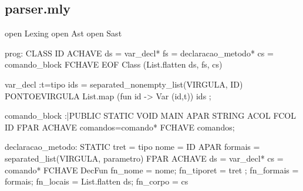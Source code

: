\documentclass[12pt,a4paper,twoside]{report}
\begin{document}
\subsection{parser.mly}
\begin{terminal}

open Lexing
open Ast
open Sast







prog: 
	   CLASS ID ACHAVE
            ds = var_decl*
            fs = declaracao_metodo*
            cs = comando_block
          FCHAVE
          EOF { Class (List.flatten ds, fs, cs) }


var_decl :t=tipo ids = separated_nonempty_list(VIRGULA, ID) PONTOEVIRGULA{
                   List.map (fun id -> Var (id,t)) ids
          };

          comando_block :|PUBLIC STATIC VOID  MAIN APAR STRING ACOL FCOL ID FPAR ACHAVE comandos=comando* FCHAVE {comandos};


declaracao_metodo:   STATIC tret = tipo  nome = ID APAR formais = separated_list(VIRGULA, parametro) FPAR 
		   ACHAVE
  			ds = var_decl*
  			cs = comando*
  		FCHAVE {
    			DecFun {
      				fn_nome = nome;
      				fn_tiporet = tret ;
      				fn_formais = formais;
      				fn_locais = List.flatten ds;
      				fn_corpo = cs
    			}
 		}


\end{terminal}
\end{document}
